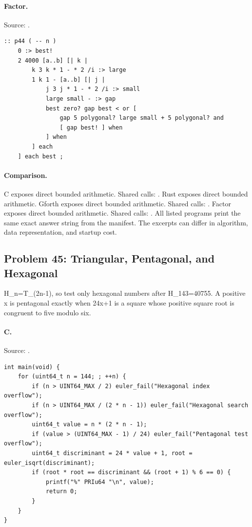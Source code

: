 \paragraph{Factor.} Source: .
\begin{lstlisting}
:: p44 ( -- n )
    0 :> best!
    2 4000 [a..b] [| k |
        k 3 k * 1 - * 2 /i :> large
        1 k 1 - [a..b] [| j |
            j 3 j * 1 - * 2 /i :> small
            large small - :> gap
            best zero? gap best < or [
                gap 5 polygonal? large small + 5 polygonal? and
                [ gap best! ] when
            ] when
        ] each
    ] each best ;
\end{lstlisting}

\paragraph{Comparison.}
C exposes direct bounded arithmetic. Shared calls: \texttt{}. Rust exposes direct bounded arithmetic. Gforth exposes direct bounded arithmetic. Shared calls: \texttt{}. Factor exposes direct bounded arithmetic. Shared calls: \texttt{}.
All listed programs print the same exact answer string from the manifest. The excerpts can differ in algorithm, data representation, and startup cost.

\subsection{Problem 45: Triangular, Pentagonal, and Hexagonal}
\label{walkthrough:p45}
H\_n=T\_(2n-1), so test only hexagonal numbers after H\_143=40755. A positive x is pentagonal exactly when 24x+1 is a square whose positive square root is congruent to five modulo six.

\paragraph{C.} Source: .
\begin{lstlisting}
int main(void) {
    for (uint64_t n = 144; ; ++n) {
        if (n > UINT64_MAX / 2) euler_fail("Hexagonal index overflow");
        if (n > UINT64_MAX / (2 * n - 1)) euler_fail("Hexagonal search overflow");
        uint64_t value = n * (2 * n - 1);
        if (value > (UINT64_MAX - 1) / 24) euler_fail("Pentagonal test overflow");
        uint64_t discriminant = 24 * value + 1, root = euler_isqrt(discriminant);
        if (root * root == discriminant && (root + 1) % 6 == 0) {
            printf("%" PRIu64 "\n", value);
            return 0;
        }
    }
}
\end{lstlisting}

